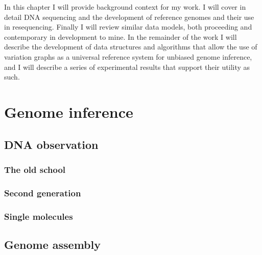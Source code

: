 In this chapter I will provide background context for my work.
I will cover in detail DNA sequencing and the development of reference genomes and their use in resequencing.
Finally I will review similar data models, both proceeding and contemporary in development to mine.
In the remainder of the work I will describe the development of data structures and algorithms that allow the use of variation graphs as a universal reference system for unbiased genome inference, and I will describe a series of experimental results that support their utility as such.

\section{Genome inference}

\subsection{DNA observation}

\subsubsection{The old school}

\subsubsection{Second generation}

\subsubsection{Single molecules}

\subsection{Genome assembly}


